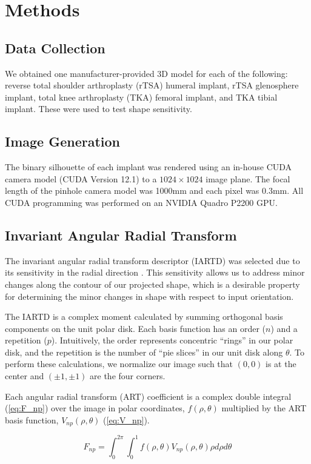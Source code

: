 \section{Methods}

\subsection{Data Collection}
We obtained one manufacturer-provided 3D model for each of the following: reverse total shoulder arthroplasty (rTSA) humeral implant, rTSA glenosphere implant, total knee arthroplasty (TKA) femoral implant, and TKA tibial implant. These were used to test shape sensitivity.
\subsection{Image Generation}
The binary silhouette of each implant was rendered using an in-house CUDA camera model (CUDA Version 12.1) \cite{nickollsScalableParallelProgramming2008} to a $1024\times 1024$ image plane.
The focal length of the pinhole camera model was 1000mm and each pixel was 0.3mm.
All CUDA programming was performed on an NVIDIA Quadro P2200 GPU.
\subsection{Invariant Angular Radial Transform}
The invariant angular radial transform descriptor (IARTD) was selected due to its sensitivity in the radial direction \cite{leeNewShapeDescription2012}.
This sensitivity allows us to address minor changes along the contour of our projected shape, which is a desirable property for determining the minor changes in shape with respect to input orientation.

The IARTD is a complex moment calculated by summing orthogonal basis components on the unit polar disk.
Each basis function has an order ($n$) and a repetition ($p$).
Intuitively, the order represents concentric ``rings'' in our polar disk, and the repetition is the number of ``pie slices'' in our unit disk along $\theta$.
To perform these calculations, we normalize our image such that $(0,0)$ is at the center and $(\pm1,\pm1)$ are the four corners.

Each angular radial transform (ART) coefficient is a complex double integral (\cref{eq:F_np}) over the image in polar coordinates, $f(\rho,\theta)$ multiplied by the ART basis function, $V_{np}(\rho,\theta)$ (\cref{eq:V_np}).

\begin{equation}
	\label{eq:F_np}
	F_{np} = \int_{0}^{2\pi}\int_{0}^{1}f(\rho,\theta)V_{np}(\rho,\theta)\rho d\rho d\theta
\end{equation}

